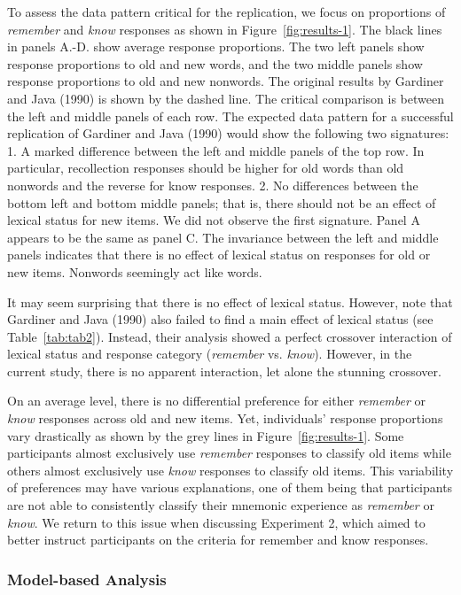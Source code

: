 \documentclass[english,,man]{apa6}
\begin{document}
To assess the data pattern critical for the replication, we focus on proportions of \emph{remember} and \emph{know} responses as shown in Figure~\ref{fig:results-1}. The black lines in panels A.-D. show average response proportions. The two left panels show response proportions to old and new words, and the two middle panels show response proportions to old and new nonwords. The original results by Gardiner and Java (1990) is shown by the dashed line. The critical comparison is between the left and middle panels of each row. The expected data pattern for a successful replication of Gardiner and Java (1990) would show the following two signatures: 1. A marked difference between the left and middle panels of the top row. In particular, recollection responses should be higher for old words than old nonwords and the reverse for know responses. 2. No differences between the bottom left and bottom middle panels; that is, there should not be an effect of lexical status for new items. We did not observe the first signature. Panel A appears to be the same as panel C. The invariance between the left and middle panels indicates that there is no effect of lexical status on responses for old or new items. Nonwords seemingly act like words.

It may seem surprising that there is no effect of lexical status. However, note that Gardiner and Java (1990) also failed to find a main effect of lexical status (see Table~\ref{tab:tab2}). Instead, their analysis showed a perfect crossover interaction of lexical status and response category (\emph{remember} vs. \emph{know}). However, in the current study, there is no apparent interaction, let alone the stunning crossover.

On an average level, there is no differential preference for either \emph{remember} or \emph{know} responses across old and new items. Yet, individuals' response proportions vary drastically as shown by the grey lines in Figure~\ref{fig:results-1}. Some participants almost exclusively use \emph{remember} responses to classify old items while others almost exclusively use \emph{know} responses to classify old items. This variability of preferences may have various explanations, one of them being that participants are not able to consistently classify their mnemonic experience as \emph{remember} or \emph{know}. We return to this issue when discussing Experiment 2, which aimed to better instruct participants on the criteria for remember and know responses.

\hypertarget{model-based-analysis}{%
\subsubsection{Model-based Analysis}\label{model-based-analysis}}
\end{document}

